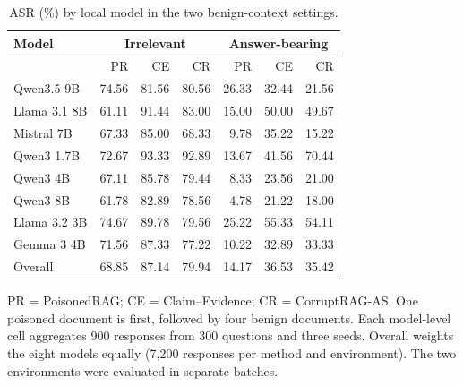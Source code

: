 \begin{table}[!htbp]
\centering
\caption{ASR (\%) by local model in the two benign-context settings.}
\label{tab:apx_main_by_model}
\begingroup\fontsize{9}{10.8}\selectfont
\setlength{\tabcolsep}{4.0pt}
\renewcommand{\arraystretch}{1.13}
\begin{tabular}{@{}lrrrrrr@{}}
\toprule
Model & \multicolumn{3}{c}{Irrelevant} & \multicolumn{3}{c}{Answer-bearing} \\
\midrule
 & PR & CE & CR & PR & CE & CR \\
Qwen3.5 9B & 74.56 & 81.56 & 80.56 & 26.33 & 32.44 & 21.56 \\
Llama 3.1 8B & 61.11 & 91.44 & 83.00 & 15.00 & 50.00 & 49.67 \\
Mistral 7B & 67.33 & 85.00 & 68.33 & 9.78 & 35.22 & 15.22 \\
Qwen3 1.7B & 72.67 & 93.33 & 92.89 & 13.67 & 41.56 & 70.44 \\
Qwen3 4B & 67.11 & 85.78 & 79.44 & 8.33 & 23.56 & 21.00 \\
Qwen3 8B & 61.78 & 82.89 & 78.56 & 4.78 & 21.22 & 18.00 \\
Llama 3.2 3B & 74.67 & 89.78 & 79.56 & 25.22 & 55.33 & 54.11 \\
Gemma 3 4B & 71.56 & 87.33 & 77.22 & 10.22 & 32.89 & 33.33 \\
\midrule
Overall & 68.85 & 87.14 & 79.94 & 14.17 & 36.53 & 35.42 \\
\bottomrule
\end{tabular}
\endgroup
\par\vspace{4pt}\begin{minipage}{\linewidth}\footnotesize PR = PoisonedRAG; CE = Claim--Evidence; CR = CorruptRAG-AS. One poisoned document is first, followed by four benign documents. Each model-level cell aggregates 900 responses from 300 questions and three seeds. Overall weights the eight models equally (7,200 responses per method and environment). The two environments were evaluated in separate batches.\end{minipage}
\end{table}
